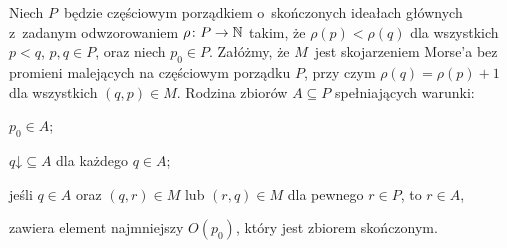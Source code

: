 \begin{lem}\label{lem-351}
Niech $P$~będzie częściowym porządkiem o~skończonych ideałach głównych z~zadanym odwzorowaniem $\rho\colon P\to\mathbb{N}$ takim, że $\rho(p)<\rho(q)$ dla wszystkich $p<q$, $p,q\in P$, oraz niech $p_0\in P$. Załóżmy, że $M$~jest skojarzeniem Morse'a bez promieni malejących na częściowym porządku $P$, przy czym $\rho(q)=\rho(p)+1$ dla wszystkich $(q,p)\in M$. Rodzina zbiorów $A\subseteq P$ spełniających warunki:
\begin{compactenum}[\quad\ 1)]
\item\label{351-1} $p_0\in A$;
\item\label{351-2} $q\mathord{\downarrow} \subseteq A$ dla każdego $q\in A$; 
\item\label{351-3} jeśli $q\in A$ oraz $(q,r)\in M$ lub $(r,q)\in M$ dla pewnego $r\in P$, to $r\in A$,
\end{compactenum}
zawiera element najmniejszy $O(p_0)$, który jest zbiorem skończonym.
\end{lem}
